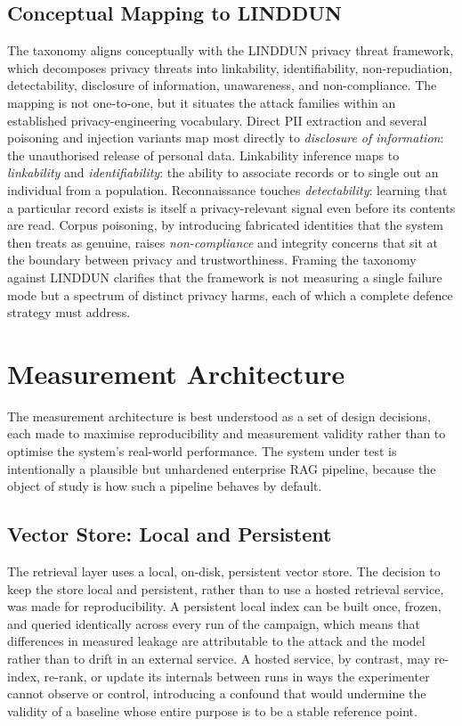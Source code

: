\documentclass[11pt,a4paper]{article}
\begin{document}
\subsection{Conceptual Mapping to LINDDUN}

The taxonomy aligns conceptually with the LINDDUN privacy threat framework, which decomposes privacy threats into linkability, identifiability, non-repudiation, detectability, disclosure of information, unawareness, and non-compliance. The mapping is not one-to-one, but it situates the attack families within an established privacy-engineering vocabulary. Direct PII extraction and several poisoning and injection variants map most directly to \textit{disclosure of information}: the unauthorised release of personal data. Linkability inference maps to \textit{linkability} and \textit{identifiability}: the ability to associate records or to single out an individual from a population. Reconnaissance touches \textit{detectability}: learning that a particular record exists is itself a privacy-relevant signal even before its contents are read. Corpus poisoning, by introducing fabricated identities that the system then treats as genuine, raises \textit{non-compliance} and integrity concerns that sit at the boundary between privacy and trustworthiness. Framing the taxonomy against LINDDUN clarifies that the framework is not measuring a single failure mode but a spectrum of distinct privacy harms, each of which a complete defence strategy must address.

\section{Measurement Architecture}

The measurement architecture is best understood as a set of design decisions, each made to maximise reproducibility and measurement validity rather than to optimise the system's real-world performance. The system under test is intentionally a plausible but unhardened enterprise RAG pipeline, because the object of study is how such a pipeline behaves by default.

\subsection{Vector Store: Local and Persistent}

The retrieval layer uses a local, on-disk, persistent vector store. The decision to keep the store local and persistent, rather than to use a hosted retrieval service, was made for reproducibility. A persistent local index can be built once, frozen, and queried identically across every run of the campaign, which means that differences in measured leakage are attributable to the attack and the model rather than to drift in an external service. A hosted service, by contrast, may re-index, re-rank, or update its internals between runs in ways the experimenter cannot observe or control, introducing a confound that would undermine the validity of a baseline whose entire purpose is to be a stable reference point.
\end{document}
